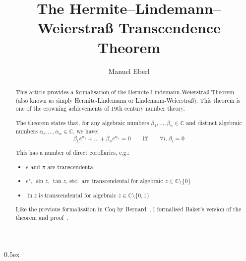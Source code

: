\documentclass[11pt,a4paper]{article}
\begin{document}
\title{The Hermite--Lindemann--Weierstraß Transcendence Theorem}
\author{Manuel Eberl}
\maketitle

\begin{abstract}
This article provides a formalisation of the Her\-mite\--Lin\-de\-mann\--Wei\-er\-straß Theorem
(also known as simply Her\-mite\--Lin\-de\-mann or Lin\-de\-mann\--Wei\-er\-straß). This theorem is one of the
crowning achievements of 19th century number theory.

The theorem states that, for any algebraic numbers $\beta_1, \ldots, \beta_n\in\mathbb{C}$ and
distinct algebraic numbers $\alpha_i, \ldots, \alpha_n\in\mathbb{C}$, we have:
\[\beta_1 e^{\alpha_1} + \ldots + \beta_n e^{\alpha_n} = 0 \quad\quad\text{iff}\quad\quad
  \forall i.\ \beta_i = 0\]

This has a number of direct corollaries, e.g.:
\begin{itemize}
\item $e$ and $\pi$ are transcendental
\item $e^z$, $\sin z$, $\tan z$, etc.\ are transcendental for algebraic $z\in\mathbb{C}\setminus\{0\}$
\item $\ln z$ is transcendental for algebraic $z\in\mathbb{C}\setminus\{0, 1\}$
\end{itemize}

Like the previous formalisation in Coq by Bernard~\cite{bernard}, I formalised Baker's version
of the theorem and proof~\cite{baker}.
\end{abstract}

\newpage
\tableofcontents
\newpage
\parindent 0pt\parskip 0.5ex



\nocite{baker}
\nocite{redheffer_steinberg}
\nocite{bernard}



\end{document}
